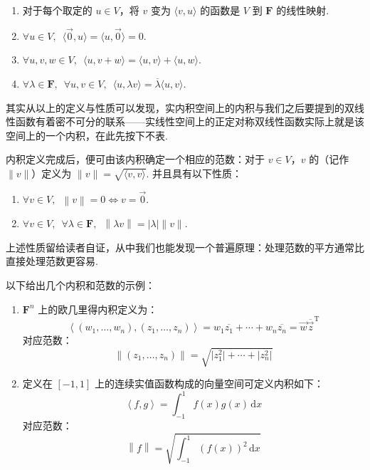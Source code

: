\begin{enumerate}
    \item 对于每个取定的 $u \in V$，将 $ v $ 变为 $\langle v, u \rangle$ 的函数是 $ V $ 到 $\mathbf{F}$ 的线性映射.

    \item $\forall u \in V, \enspace \langle \vec{0}, u \rangle = \langle u, \vec{0} \rangle = 0$.

    \item $\forall u, v, w \in V, \enspace \langle u, v + w \rangle = \langle u, v \rangle + \langle u, w \rangle$.

    \item $\forall \lambda \in \mathbf{F}, \enspace \forall u, v \in V, \enspace \langle u, \lambda v \rangle = \overline{\lambda} \langle u, v \rangle$.
\end{enumerate}

其实从以上的定义与性质可以发现，实内积空间上的内积与我们之后要提到的双线性函数有着密不可分的联系——实线性空间上的正定对称双线性函数实际上就是该空间上的一个内积，在此先按下不表.

内积定义完成后，便可由该内积确定一个相应的范数：对于 $v \in V$，$v$ 的（记作 $ \lVert v \rVert $）定义为 $ \lVert v \rVert = \sqrt{\langle v, v \rangle}$. 并且具有以下性质：

\begin{enumerate}
    \item $\forall v \in V, \enspace \left\lVert v \right\rVert = 0 \iff v = \vec{0}$.

    \item $\forall v \in V, \enspace \forall \lambda \in \mathbf{F}, \enspace \left\lVert \lambda v \right\rVert  = \left\lvert \lambda \right\rvert \lVert v \rVert$.
\end{enumerate}

上述性质留给读者自证，从中我们也能发现一个普遍原理：处理范数的平方通常比直接处理范数更容易.

以下给出几个内积和范数的示例：

\begin{example} \label{ex:23:内积和范数}
    \begin{enumerate}
        \item $\mathbf{F}^{n}$ 上的欧几里得内积定义为：
              \[\left\langle (w_1, \ldots, w_n), (z_1, \ldots, z_n)\right\rangle = w_1\overline{z_1} + \cdots + w_n\overline{z_n} = \vec{w}\overline{\vec{z}}^{\mathrm{T}}\]
              对应范数：
              \[\left\lVert (z_1, \ldots, z_n) \right\rVert  = \sqrt{\lvert z^2_1 \rvert + \cdots + \lvert z^2_n \rvert}\]

        \item \label{item:23:内积和范数:2}
              定义在 $ \left[-1, 1\right] $ 上的连续实值函数构成的向量空间可定义内积如下：
              \[\left\langle f, g\right\rangle = \int_{-1}^1f(x)g(x)\,\mathrm{d}x\]
              对应范数：
              \[\left\lVert f \right\rVert = \sqrt{\int_{-1}^1(f(x))^2\,\mathrm{d}x}\]
    \end{enumerate}
\end{example}

